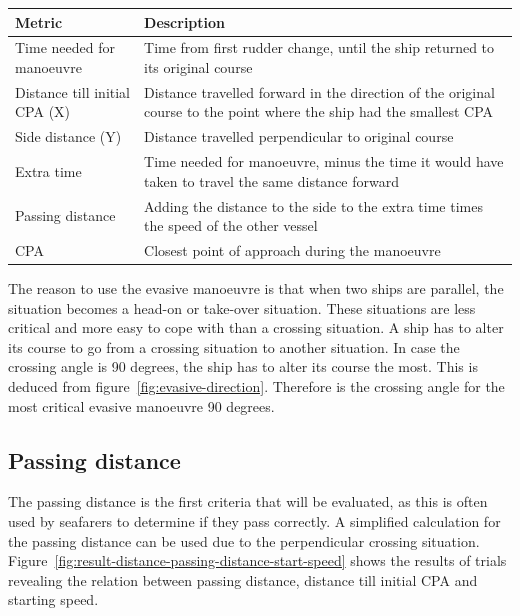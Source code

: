 \begin{table}[ht]
	\begin{tabular}{p{}|p{}}
		\toprule
		Metric & Description\\
		\midrule
		Time needed for manoeuvre & Time from first rudder change, until the ship returned to its original course \\
		Distance till initial CPA (X) & Distance travelled forward in the direction of the original course to the point where the ship had the smallest CPA \\
		Side distance (Y) & Distance travelled perpendicular to original course\\
		Extra time & Time needed for manoeuvre, minus the time it would have taken to travel the same distance forward \\
		Passing distance & Adding the distance to the side to the extra time times the speed of the other vessel \\
		\ac{CPA} & Closest point of approach during the manoeuvre \\
		\bottomrule
	\end{tabular}
	
	\label{tab:evasive-manoeuvrer-metrics}
\end{table}

The reason to use the evasive manoeuvre is that when two ships are parallel, the situation becomes a head-on or take-over situation. These situations are less critical and more easy to cope with than a crossing situation. A ship has to alter its course to go from a crossing situation to another situation. In case the crossing angle is 90 degrees, the ship has to alter its course the most. This is deduced from figure~\ref{fig:evasive-direction}. Therefore is the crossing angle for the most critical evasive manoeuvre 90 degrees.

\subsection{Passing distance}
The passing distance is the first criteria that will be evaluated, as this is often used by seafarers to determine if they pass correctly. A simplified calculation for the passing distance can be used due to the perpendicular crossing situation. 
Figure~\ref{fig:result-distance-passing-distance-start-speed} shows the results of trials revealing the relation between passing distance, distance till initial CPA and starting speed.


